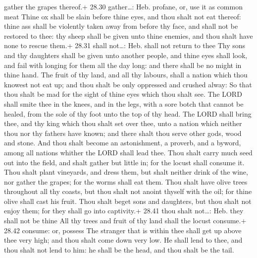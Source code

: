 gather the grapes thereof.+ 28.30 gather\ldots: Heb. profane, or, use it
as common meat  Thine ox shall be slain before thine eyes,
and thou shalt not eat thereof: thine ass shall be violently taken away
from before thy face, and shall not be restored to thee: thy sheep shall
be given unto thine enemies, and thou shalt have none to rescue them.+
28.31 shall not\ldots: Heb. shall not return to thee  Thy
sons and thy daughters shall be given unto another people, and thine
eyes shall look, and fail with longing for them all the day long: and
there shall be no might in thine hand.  The fruit of thy
land, and all thy labours, shall a nation which thou knowest not eat up;
and thou shalt be only oppressed and crushed alway:  So
that thou shalt be mad for the sight of thine eyes which thou shalt see.
 The LORD shall smite thee in the knees, and in the legs,
with a sore botch that cannot be healed, from the sole of thy foot unto
the top of thy head.  The LORD shall bring thee, and thy
king which thou shalt set over thee, unto a nation which neither thou
nor thy fathers have known; and there shalt thou serve other gods, wood
and stone.  And thou shalt become an astonishment, a
proverb, and a byword, among all nations whither the LORD shall lead
thee.  Thou shalt carry much seed out into the field, and
shalt gather but little in; for the locust shall consume it.
 Thou shalt plant vineyards, and dress them, but shalt
neither drink of the wine, nor gather the grapes; for the worms shall
eat them.  Thou shalt have olive trees throughout all thy
coasts, but thou shalt not anoint thyself with the oil; for thine olive
shall cast his fruit.  Thou shalt beget sons and daughters,
but thou shalt not enjoy them; for they shall go into captivity.+ 28.41
thou shalt not\ldots: Heb. they shall not be thine  All thy
trees and fruit of thy land shall the locust consume.+ 28.42 consume:
or, possess  The stranger that is within thee shall get up
above thee very high; and thou shalt come down very low. 
He shall lend to thee, and thou shalt not lend to him: he shall be the
head, and thou shalt be the tail.

